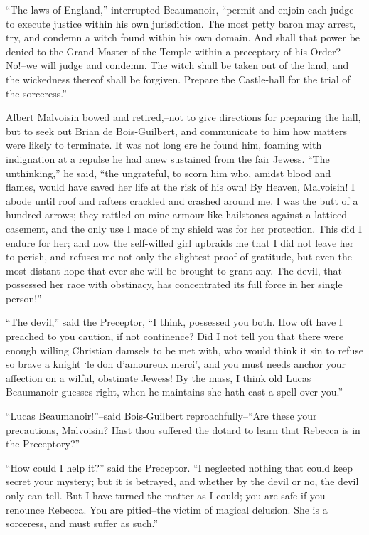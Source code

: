 ``The laws of England,'' interrupted Beaumanoir, ``permit and enjoin
each judge to execute justice within his own jurisdiction. The most
petty baron may arrest, try, and condemn a witch found within his own
domain. And shall that power be denied to the Grand Master of the Temple
within a preceptory of his Order?--No!--we will judge and condemn. The
witch shall be taken out of the land, and the wickedness thereof shall
be forgiven. Prepare the Castle-hall for the trial of the sorceress.''

Albert Malvoisin bowed and retired,--not to give directions for
preparing the hall, but to seek out Brian de Bois-Guilbert, and
communicate to him how matters were likely to terminate. It was not long
ere he found him, foaming with indignation at a repulse he had anew
sustained from the fair Jewess. ``The unthinking,'' he said, ``the
ungrateful, to scorn him who, amidst blood and flames, would have saved
her life at the risk of his own! By Heaven, Malvoisin! I abode until
roof and rafters crackled and crashed around me. I was the butt of a
hundred arrows; they rattled on mine armour like hailstones against a
latticed casement, and the only use I made of my shield was for her
protection. This did I endure for her; and now the self-willed girl
upbraids me that I did not leave her to perish, and refuses me not only
the slightest proof of gratitude, but even the most distant hope that
ever she will be brought to grant any. The devil, that possessed her
race with obstinacy, has concentrated its full force in her single
person!''

``The devil,'' said the Preceptor, ``I think, possessed you both. How
oft have I preached to you caution, if not continence? Did I not tell
you that there were enough willing Christian damsels to be met with, who
would think it sin to refuse so brave a knight `le don d'amoureux
merci', and you must needs anchor your affection on a wilful, obstinate
Jewess! By the mass, I think old Lucas Beaumanoir guesses right, when he
maintains she hath cast a spell over you.''

``Lucas Beaumanoir!''--said Bois-Guilbert reproachfully--``Are these
your precautions, Malvoisin? Hast thou suffered the dotard to learn that
Rebecca is in the Preceptory?''

``How could I help it?'' said the Preceptor. ``I neglected nothing that
could keep secret your mystery; but it is betrayed, and whether by the
devil or no, the devil only can tell. But I have turned the matter as I
could; you are safe if you renounce Rebecca. You are pitied--the victim
of magical delusion. She is a sorceress, and must suffer as such.''

